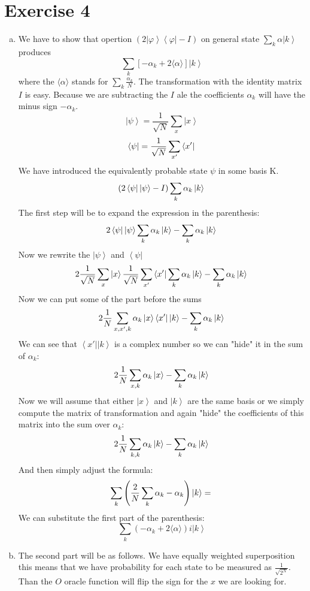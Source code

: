 \documentclass[a4paper,10pt]{article}
\newcommand{\bra}[1]{\ensuremath{\left\langle#1\right|}} %
\newcommand{\ket}[1]{\ensuremath{\left|#1\right\rangle}} %
\newcommand{\al}{\ensuremath{\alpha}}
\begin{document}
\section*{Exercise 4}
\begin{enumerate}[a)]
\item 
We have to show that opertion $(2\ket{\varphi}\bra{\varphi} - I)$ on general state $\sum_k \alpha \ket{k}$ produces
$$
\sum_k \left[ - \alpha_k + 2\langle\alpha\rangle \right] \ket{k}
$$
where the $\langle \al \rangle$ stands for $\sum_k \frac{\al_k}{N}$.
The transformation with the identity matrix $I$ is easy. Because we are subtracting the $I$ ale the coefficients $\alpha_k$ will have the minus sign $-\alpha_k$.
$$
\ket{\psi}  =  \frac{1}{\sqrt{N}} \sum_{x } \ket{x}
$$
$$
\bra{\psi}  =  \frac{1}{\sqrt{N}} \sum_{x'} \bra{x'} \\
$$
We have introduced the equivalently probable state $\psi$ in some basis K.
$$
\left( 2\bra{\psi}\ket{\psi} - I\right)  \sum_k \al_k\ket{k}\\
$$
The first step will be to expand the expression in the parenthesis:
$$
2\bra{\psi}\ket{\psi} \sum_k \al_k\ket{k} - \sum_k \al_k\ket{k}\\
$$
Now we rewrite the \ket{\psi} and \bra{\psi}
$$
2 \frac{1}{\sqrt{N}} \sum_{x } \ket{x}  \frac{1}{\sqrt{N}} \sum_{x'} \bra{x'}\sum_k \al_k\ket{k} -  \sum_k \al_k\ket{k}\\
$$
Now we can put some of the part before the sums
$$
2 \frac{1}{N} \sum_{x,x',k} \al_k \ket{x}  \bra{x'}\ket{k} -  \sum_k \al_k\ket{k}\\
$$
We can see that $\bra{x'}\ket{k}$ is a complex number so we can "hide" it in the sum of $\al_k$:
$$
2 \frac{1}{N} \sum_{x,k} \al_k \ket{x} -  \sum_k \al_k\ket{k}\\
$$
Now we will assume that either \ket{x} and \ket{k} are the same basis or we simply compute the matrix of transformation and again "hide" the coefficients of this matrix into the sum over $\al_k$:
$$
2 \frac{1}{N} \sum_{k,k} \al_k \ket{k} -  \sum_k \al_k\ket{k}\\
$$
And then simply adjust the formula:
$$
\sum_k \left( \frac{2}{N}\sum_{k} \al_k -  \al_k \right)\ket{k}= \\
$$
We can substitute the first part of the parenthesis:
$$
\sum_k \left( - \alpha_k + 2\langle\alpha\rangle \right)i \ket{k}
$$
\item The second part will be as follows. We have equally weighted superposition this means that we have probability for each state to be measured as $\frac{1}{\sqrt{2^N}}$. Than the $O$ oracle function will flip the sign for the $x$ we are looking for. \\

\end{enumerate}
\end{document}
